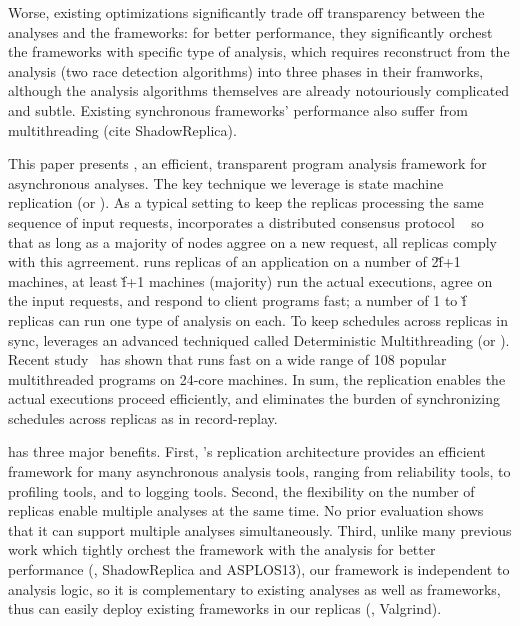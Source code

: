 Worse, existing optimizations significantly trade off transparency between the 
analyses and the frameworks: for better performance, they significantly orchest 
the frameworks with specific type of analysis, which requires reconstruct from 
the analysis (two race detection algorithms) into three phases in their 
framworks, although the analysis algorithms themselves are already notouriously 
complicated and subtle. Existing synchronous frameworks' performance also 
suffer from multithreading (cite ShadowReplica).


This paper presents \xxx, an efficient, transparent program 
analysis framework for asynchronous analyses. The key technique we leverage is 
state machine replication (or \smr). As a typical \smr setting to keep the 
replicas processing the same sequence of input requests, \xxx incorporates a 
distributed consensus protocol \paxos~\cite{paxos} so that as long as a 
majority of nodes aggree on a new request, all replicas comply with this 
agrreement. \xxx runs replicas of an application on a number of 2\v{f}+1 
machines, at least \v{f}+1 machines (majority) run the actual executions, agree 
on the input requests, and respond to client programs fast; a number of 1 to 
\v{f} replicas can run one type of analysis on each. To keep 
schedules across replicas in sync, \repbox leverages an advanced techniqued 
called Deterministic Multithreading (or \dmt). Recent 
study~\cite{parrot:sosp13} has shown that \dmt runs fast on a wide range of 108 
popular multithreaded programs on 24-core machines. In sum, the \smr 
replication enables the actual executions proceed efficiently, and \dmt 
eliminates the burden of synchronizing schedules across replicas as in 
record-replay.


\xxx has three major benefits. First, \xxx's replication architecture provides 
an efficient framework for many asynchronous analysis tools, ranging from 
reliability tools, to profiling tools, and to logging tools. Second, the 
flexibility on the number of replicas enable multiple analyses at the same 
time. No prior evaluation shows that it can support multiple analyses 
simultaneously. Third, unlike many previous work which tightly orchest the 
framework with the analysis for better performance (\eg, ShadowReplica and 
ASPLOS13), our framework is independent to analysis logic, so it is 
complementary to existing analyses as well as frameworks, thus \xxx can easily 
deploy existing frameworks in our replicas (\eg, Valgrind).


